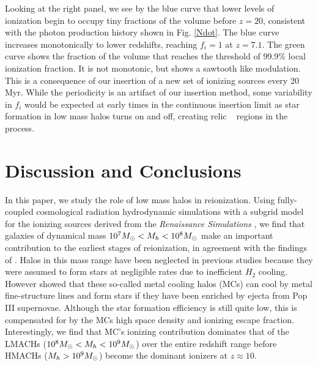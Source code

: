 \documentclass[iop,apj]{emulateapj}
\begin{document}
Looking at the right panel, we see by the blue curve that lower levels of ionization begin to occupy tiny fractions of the volume before $z=20$, consistent with the photon production history shown in Fig. \ref{Ndot}. The blue curve increases monotonically to lower redshifts, reaching $f_i = 1$ at $z=7.1$. The green curve shows the fraction of the volume that reaches the threshold of 99.9\% local ionization fraction. It is not monotonic, but shows a sawtooth like modulation. This is a consequence of our insertion of a new set of ionizing sources every 20 Myr. While the periodicity is an artifact of our insertion method, some variability in $f_i$ would be expected at early times in the continuous insertion limit as star formation in low mass halos turns on and off, creating relic \hii~ regions in the process. 

\section{Discussion and Conclusions}
\label{sec:discussion}

In this paper, we study the role of low mass halos in reionization. Using fully-coupled cosmological radiation hydrodynamic simulations with a subgrid model for the ionizing sources derived from the {\it Renaissance Simulations} \citep{Xu16}, we find that galaxies of dynamical mass $10^7M_\odot<M_h<10^8M_\odot$ make an important contribution to the earliest stages of reionization, in agreement with the findings of \cite{Wise14}. Halos in this mass range have been neglected in previous studies because they were assumed to form stars at negligible rates due to inefficient $H_2$ cooling. However \cite{Wise14} showed that these so-called metal cooling halos (MCs) can cool by metal fine-structure lines and form stars if they have been enriched by ejecta from Pop III supernovae. Although the star formation efficiency is still quite low, this is compensated for by the MCs high space density and ionizing escape fraction. Interestingly, we find that MC's ionizing contribution dominates that of the LMACHs ($10^8M_\odot<M_h<10^9M_\odot$) over the entire redshift range before HMACHs ($M_h>10^9M_\odot$) become the dominant ionizers at $z \approx 10$. 
\end{document}
